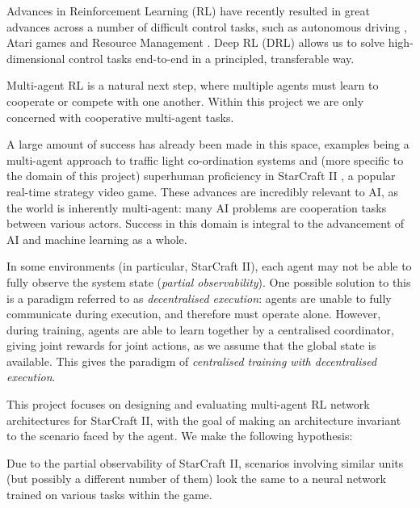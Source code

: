 Advances in Reinforcement Learning (RL) have recently resulted in great advances across a number of difficult control tasks, such as autonomous driving \cite{driving}, Atari games \cite{dqn} and Resource Management \cite{resourcemanagement}. Deep RL (DRL) allows us to solve high-dimensional control tasks end-to-end in a principled, transferable way.

Multi-agent RL is a natural next step, where multiple agents must learn to cooperate or compete with one another. Within this project we are only concerned with cooperative multi-agent tasks. 

A large amount of success has already been made in this space, examples being a multi-agent approach to traffic light co-ordination systems \cite{traffic} and (more specific to the domain of this project) superhuman proficiency in StarCraft II \cite{alphastar}, a popular real-time strategy video game. These advances are incredibly relevant to AI, as the world is inherently multi-agent: many AI problems are cooperation tasks between various actors. Success in this domain is integral to the advancement of AI and machine learning as a whole.

In some environments (in particular, StarCraft II), each agent may not be able to fully observe the system state (\textit{partial observability}). One possible solution to this is a paradigm referred to as \textit{decentralised execution}: agents are unable to fully communicate during execution, and therefore must operate alone. However, during training, agents are able to learn together by a centralised coordinator, giving joint rewards for joint actions, as we assume that the global state is available. This gives the paradigm of \textit{centralised training with decentralised execution}.







This project focuses on designing and evaluating multi-agent RL network architectures for StarCraft II, with the goal of making an architecture invariant to the scenario faced by the agent. We make the following hypothesis:

\begin{hyp} \label{hyp:first}
Due to the partial observability of StarCraft II, scenarios involving similar units (but possibly a different number of them) look the same to a neural network trained on various tasks within the game.
\end{hyp}

